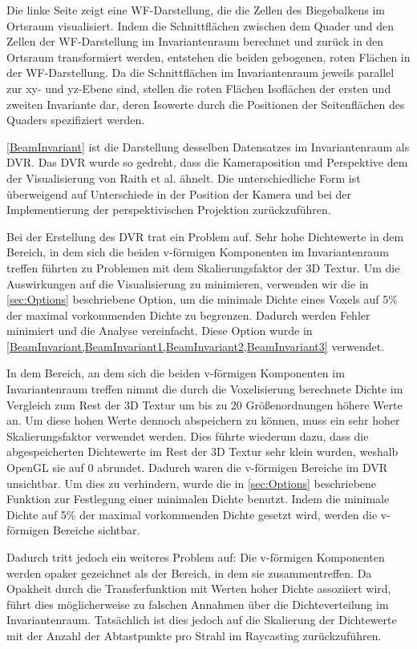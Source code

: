 \documentclass[a4paper,fontsize=12pt,toc=bib,parskip=half,ngerman]{scrartcl}
\begin{document}
Die linke Seite zeigt eine WF-Darstellung, die die Zellen des Biegebalkens im Ortsraum visualisiert. Indem die Schnittfl\"achen zwischen dem Quader und den Zellen der WF-Darstellung im Invariantenraum berechnet und zur\"uck in den Ortsraum transformiert werden, entstehen die beiden gebogenen, roten Fl\"achen in der WF-Darstellung. Da die Schnittfl\"achen im Invariantenraum jeweils parallel zur xy- und yz-Ebene sind, stellen die roten Fl\"achen Isofl\"achen der ersten und zweiten Invariante dar, deren Isowerte durch die Positionen der Seitenfl\"achen des Quaders spezifiziert werden.

\cref{BeamInvariant} ist die Darstellung desselben Datensatzes im Invariantenraum als DVR. Das DVR wurde so gedreht, dass die Kameraposition und Perspektive dem der Visualisierung von Raith et al. \"ahnelt. Die unterschiedliche Form ist \"uberweigend auf Unterschiede in der Position der Kamera und bei der Implementierung der perspektivischen Projektion zur\"uckzuf\"uhren.

Bei der Erstellung des DVR trat ein Problem auf. Sehr hohe Dichtewerte in dem Bereich, in dem sich die beiden v-f\"ormigen Komponenten im Invariantenraum treffen f\"uhrten zu Problemen mit dem Skalierungsfaktor der 3D Textur. Um die Auswirkungen auf die Visualisierung zu minimieren, verwenden wir die in \ref{sec:Options} beschriebene Option, um die minimale Dichte eines Voxels auf 5\% der maximal vorkommenden Dichte zu begrenzen. Dadurch werden Fehler minimiert und die Analyse vereinfacht. Diese Option wurde in \cref{BeamInvariant,BeamInvariant1,BeamInvariant2,BeamInvariant3} verwendet.


In dem Bereich, an dem sich die beiden v-f\"ormigen Komponenten im Invariantenraum treffen nimmt die durch die Voxelisierung berechnete Dichte im Vergleich zum Rest der 3D Textur um bis zu 20 Gr\"o{\ss}enordnungen h\"ohere Werte an. Um diese hohen Werte dennoch abspeichern zu k\"onnen, muss ein sehr hoher Skalierungsfaktor verwendet werden. Dies f\"uhrte wiederum dazu, dass die abgespeicherten Dichtewerte im Rest der 3D Textur sehr klein wurden, weshalb OpenGL sie auf 0 abrundet. Dadurch waren die v-f\"ormigen Bereiche im DVR unsichtbar. Um dies zu verhindern, wurde die in \cref{sec:Options} beschriebene Funktion zur Festlegung einer minimalen Dichte benutzt. Indem die minimale Dichte auf 5\% der maximal vorkommenden Dichte gesetzt wird, werden die v-f\"ormigen Bereiche sichtbar.


Dadurch tritt jedoch ein weiteres Problem auf: Die v-f\"ormigen Komponenten werden opaker gezeichnet als der Bereich, in dem sie zusammentreffen. Da Opakheit durch die Transferfunktion mit Werten hoher Dichte assoziiert wird, f\"uhrt dies m\"oglicherweise zu falschen Annahmen \"uber die Dichteverteilung im Invariantenraum. Tats\"achlich ist dies jedoch auf die Skalierung der Dichtewerte mit der Anzahl der Abtastpunkte pro Strahl im Raycasting zur\"uckzuf\"uhren.
\end{document}

